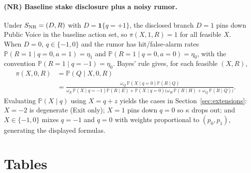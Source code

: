 \documentclass[11pt]{article}
\newcommand{\PP}{\mathbb{P}}
\newcommand{\1}{\mathbf{1}}
\begin{document}
\paragraph{(NR) Baseline stake disclosure plus a noisy rumor.}
Under $S_{\textup{NR}}=(D,R)$ with $D=\1\{q=+1\}$, the disclosed branch $D=1$ pins down Public Voice in the baseline action set, so $\pi(X,1,R)=1$ for all feasible $X$.
When $D=0$, $q\in\{-1,0\}$ and the rumor has hit/false-alarm rates $\PP(R=1 \mid q=0,a=1)=\eta_1$ and $\PP(R=1 \mid q=0,a=0)=\eta_0$, with the convention $\PP(R=1 \mid q=-1)=\eta_0$.
Bayes' rule gives, for each feasible $(X,R)$,
\begin{align*}
\pi(X,0,R)
&=\PP(Q \mid X,0,R)\\
&=\frac{\omega_Q\,\PP(X \mid q=0)\PP(R \mid Q)}
{\omega_E\,\PP(X \mid q=-1)\PP(R \mid E)+\PP(X \mid q=0)\big(\omega_H\,\PP(R \mid H)+\omega_Q\,\PP(R \mid Q)\big)}.
\end{align*}
Evaluating $\PP(X \mid q)$ using $X=q+z$ yields the cases in Section~\ref{sec:extensions}: $X=-2$ is degenerate (Exit only); $X=1$ pins down $q=0$ so $\kappa$ drops out; and $X\in\{-1,0\}$ mixes $q=-1$ and $q=0$ with weights proportional to $(p_0,p_1)$, generating the displayed formulas.

\section{Tables}
\label{app:tables}


\setcounter{table}{0}
\renewcommand{\thetable}{\thesection.\arabic{table}}

\begin{table}[H]
\centering

\caption{Baseline numerical equilibrium (values rounded to two decimals). Parameters: $\mu=1$, $\sigma_v=0.5$, $\sigma_\varepsilon=0.5$, $\delta=0.95$, $\Delta=0.25$, $C_0=0.12$, $\chi=0.5$, $\kappa=0.5$, $m_0=0.10$, $m_1=0.30$, $\bar{S}=1.44$, $K=0.15$, $\sigma_\xi=0.40$, $\rho=0.9$. Cutoffs: $k_1=k_0\approx0.82$ and $k_D\approx2.26$.}
\label{tab:example}
\end{table}

\begin{table}[H]
\centering

\caption{Illustration of posterior engagement probabilities under alternative disclosure signals (Section~\ref{sec:extensions}), evaluated at the baseline calibrated equilibrium cutoffs and $\kappa=0.5$. For NR, the rumor parameters are set to $(\eta_1,\eta_0)=(0.75,0.25)$.}
\label{tab:disclosure-extensions}
\end{table}
\end{document}
